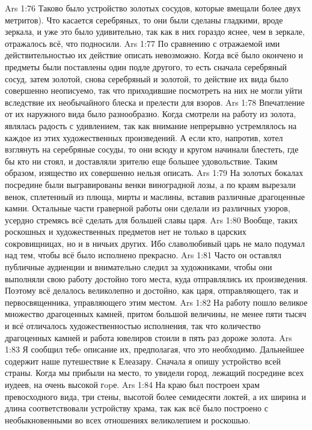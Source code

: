 \vs Ars 1:76
Таково было устройство золотых сосудов, которые вмещали более двух метритов). Что касается серебряных, то они были сделаны гладкими, вроде зеркала, и уже это было удивительно, так как в них гораздо яснее, чем в зеркале, отражалось всё, что подносили.
\vs Ars 1:77
По сравнению с отражаемой ими действительностью их действие описать невозможно. Когда всё было окончено и предметы были поставлены один подле другого, то есть сначала серебряный сосуд, затем золотой, снова серебряный и золотой, то действие их вида было совершенно неописуемо, так что приходившие посмотреть на них не могли уйти вследствие их необычайного блеска и прелести для взоров.
\vs Ars 1:78
Впечатление от их наружного вида было разнообразно. Когда смотрели на работу из золота, являлась радость с удивлением, так как внимание непрерывно устремлялось на каждое из этих художественных произведений. А если кто, напротив, хотел взглянуть на серебряные сосуды, то они всюду и кругом начинали блестеть, где бы кто ни стоял, и доставляли зрителю еще большее удовольствие. Таким образом, изящество их совершенно нельзя описать.
\vs Ars 1:79
На золотых бокалах посредине были выгравированы венки виноградной лозы, а по краям вырезали венок, сплетенный из плюща, мирты и маслины, вставив различные драгоценные камни. Остальные части граверной работы они сделали из различных узоров, усердно стремясь всё сделать для большей славы царя.
\vs Ars 1:80
Вообще, таких роскошных и художественных предметов нет не только в царских сокровищницах, но и в ничьих других. Ибо славолюбивый царь не мало подумал над тем, чтобы всё было исполнено прекрасно.
\vs Ars 1:81
Часто он оставлял публичные аудиенции и внимательно следил за художниками, чтобы они выполняли свою работу достойно того места, куда отправлялись их произведения. Поэтому всё делалось великолепно и достойно, как царя, отправляющего, так и первосвященника, управляющего этим местом.
\vs Ars 1:82
На работу пошло великое множество драгоценных камней, притом большой величины, не менее пяти тысяч и всё отличалось художественностью исполнения, так что количество драгоценных камней и работа ювелиров стоили в пять раз дороже золота.
\vs Ars 1:83
Я сообщил тебe описание их, предполагая, что это необходимо. Дальнейшее содержит наше путешествие к Елеазару. Сначала я опишу устройство всей страны. Когда мы прибыли на место, то увидели город, лежащий посредине всех иудеев, на очень высокой гopе.
\vs Ars 1:84
На краю был построен храм превосходного вида, три стены, высотой более семидесяти локтей, а их ширина и длина соответствовали устройству храма, так как всё было построено с необыкновенными во всех отношениях великолепием и роскошью.
